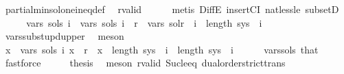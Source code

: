 \begin{isabellebody}
\ partial{\isacharunderscore}{\kern0pt}min{\isacharunderscore}{\kern0pt}sol{\isacharunderscore}{\kern0pt}one{\isacharunderscore}{\kern0pt}ineq{\isacharunderscore}{\kern0pt}def\ \isamarkupfalse%
\ r{\isacharunderscore}{\kern0pt}valid\isanewline
\ \ \ \ \isamarkupfalse%
\ {\isacharparenleft}{\kern0pt}metis\ DiffE\ insertCI\ nat{\isacharunderscore}{\kern0pt}less{\isacharunderscore}{\kern0pt}le\ subsetD{\isacharparenright}{\kern0pt}\isanewline
\ \ \isamarkupfalse%
\ \isamarkupfalse%
\ {\isachardoublequoteopen}vars\ {\isacharparenleft}{\kern0pt}sols{\isacharprime}{\kern0pt}\ i{\isacharparenright}{\kern0pt}\ {\isasymsubseteq}\ vars\ {\isacharparenleft}{\kern0pt}sols\ i{\isacharparenright}{\kern0pt}\ {\isacharminus}{\kern0pt}\ {\isacharbraceleft}{\kern0pt}r{\isacharbraceright}{\kern0pt}\ {\isasymunion}\ vars\ sol{\isacharunderscore}{\kern0pt}r{\isachardoublequoteclose}\ \ {\isachardoublequoteopen}i\ {\isacharless}{\kern0pt}\ length\ sys{\isachardoublequoteclose}\ \ i\isanewline
\ \ \ \ \isamarkupfalse%
\ vars{\isacharunderscore}{\kern0pt}subst{\isacharunderscore}{\kern0pt}upd{\isacharunderscore}{\kern0pt}upper\ \isamarkupfalse%
\ meson\isanewline
\ \ \isamarkupfalse%
\ \isamarkupfalse%
\ {\isachardoublequoteopen}{\isasymforall}x\ {\isasymin}\ vars\ {\isacharparenleft}{\kern0pt}sols{\isacharprime}{\kern0pt}\ i{\isacharparenright}{\kern0pt}{\isachardot}{\kern0pt}\ x\ {\isachargreater}{\kern0pt}\ r\ {\isasymand}\ x\ {\isacharless}{\kern0pt}\ length\ sys{\isachardoublequoteclose}\ \ {\isachardoublequoteopen}i\ {\isacharless}{\kern0pt}\ length\ sys{\isachardoublequoteclose}\ \ i\isanewline
\ \ \ \ \isamarkupfalse%
\ vars{\isacharunderscore}{\kern0pt}sols\ that\ \isamarkupfalse%
\ fastforce\isanewline
\ \ \isamarkupfalse%
\ \isamarkupfalse%
\ {\isacharquery}{\kern0pt}thesis\ \isamarkupfalse%
\ {\isacharparenleft}{\kern0pt}meson\ r{\isacharunderscore}{\kern0pt}valid\ Suc{\isacharunderscore}{\kern0pt}le{\isacharunderscore}{\kern0pt}eq\ dual{\isacharunderscore}{\kern0pt}order{\isachardot}{\kern0pt}strict{\isacharunderscore}{\kern0pt}trans{}{\isacharparenright}{\kern0pt}\isanewline
{}\isamarkupfalse%
%
\endisatagproof
{\isafoldproof}%
%
\isadelimproof
%
\endisadelimproof
%
\begin{isamarkuptext}%

\end{isamarkuptext}
\end{isabellebody}
